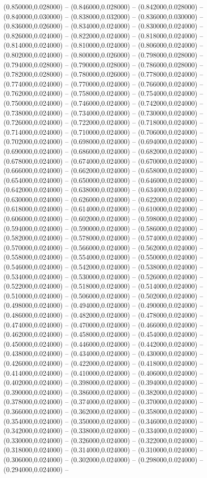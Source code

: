 (0.850000,0.028000) -- (0.846000,0.028000) -- (0.842000,0.028000) -- (0.840000,0.030000) -- (0.838000,0.032000) -- (0.836000,0.030000) -- (0.836000,0.026000) -- (0.834000,0.024000) -- (0.830000,0.024000) -- (0.826000,0.024000) -- (0.822000,0.024000) -- (0.818000,0.024000) -- (0.814000,0.024000) -- (0.810000,0.024000) -- (0.806000,0.024000) -- (0.802000,0.024000) -- (0.800000,0.026000) -- (0.798000,0.028000) -- (0.794000,0.028000) -- (0.790000,0.028000) -- (0.786000,0.028000) -- (0.782000,0.028000) -- (0.780000,0.026000) -- (0.778000,0.024000) -- (0.774000,0.024000) -- (0.770000,0.024000) -- (0.766000,0.024000) -- (0.762000,0.024000) -- (0.758000,0.024000) -- (0.754000,0.024000) -- (0.750000,0.024000) -- (0.746000,0.024000) -- (0.742000,0.024000) -- (0.738000,0.024000) -- (0.734000,0.024000) -- (0.730000,0.024000) -- (0.726000,0.024000) -- (0.722000,0.024000) -- (0.718000,0.024000) -- (0.714000,0.024000) -- (0.710000,0.024000) -- (0.706000,0.024000) -- (0.702000,0.024000) -- (0.698000,0.024000) -- (0.694000,0.024000) -- (0.690000,0.024000) -- (0.686000,0.024000) -- (0.682000,0.024000) -- (0.678000,0.024000) -- (0.674000,0.024000) -- (0.670000,0.024000) -- (0.666000,0.024000) -- (0.662000,0.024000) -- (0.658000,0.024000) -- (0.654000,0.024000) -- (0.650000,0.024000) -- (0.646000,0.024000) -- (0.642000,0.024000) -- (0.638000,0.024000) -- (0.634000,0.024000) -- (0.630000,0.024000) -- (0.626000,0.024000) -- (0.622000,0.024000) -- (0.618000,0.024000) -- (0.614000,0.024000) -- (0.610000,0.024000) -- (0.606000,0.024000) -- (0.602000,0.024000) -- (0.598000,0.024000) -- (0.594000,0.024000) -- (0.590000,0.024000) -- (0.586000,0.024000) -- (0.582000,0.024000) -- (0.578000,0.024000) -- (0.574000,0.024000) -- (0.570000,0.024000) -- (0.566000,0.024000) -- (0.562000,0.024000) -- (0.558000,0.024000) -- (0.554000,0.024000) -- (0.550000,0.024000) -- (0.546000,0.024000) -- (0.542000,0.024000) -- (0.538000,0.024000) -- (0.534000,0.024000) -- (0.530000,0.024000) -- (0.526000,0.024000) -- (0.522000,0.024000) -- (0.518000,0.024000) -- (0.514000,0.024000) -- (0.510000,0.024000) -- (0.506000,0.024000) -- (0.502000,0.024000) -- (0.498000,0.024000) -- (0.494000,0.024000) -- (0.490000,0.024000) -- (0.486000,0.024000) -- (0.482000,0.024000) -- (0.478000,0.024000) -- (0.474000,0.024000) -- (0.470000,0.024000) -- (0.466000,0.024000) -- (0.462000,0.024000) -- (0.458000,0.024000) -- (0.454000,0.024000) -- (0.450000,0.024000) -- (0.446000,0.024000) -- (0.442000,0.024000) -- (0.438000,0.024000) -- (0.434000,0.024000) -- (0.430000,0.024000) -- (0.426000,0.024000) -- (0.422000,0.024000) -- (0.418000,0.024000) -- (0.414000,0.024000) -- (0.410000,0.024000) -- (0.406000,0.024000) -- (0.402000,0.024000) -- (0.398000,0.024000) -- (0.394000,0.024000) -- (0.390000,0.024000) -- (0.386000,0.024000) -- (0.382000,0.024000) -- (0.378000,0.024000) -- (0.374000,0.024000) -- (0.370000,0.024000) -- (0.366000,0.024000) -- (0.362000,0.024000) -- (0.358000,0.024000) -- (0.354000,0.024000) -- (0.350000,0.024000) -- (0.346000,0.024000) -- (0.342000,0.024000) -- (0.338000,0.024000) -- (0.334000,0.024000) -- (0.330000,0.024000) -- (0.326000,0.024000) -- (0.322000,0.024000) -- (0.318000,0.024000) -- (0.314000,0.024000) -- (0.310000,0.024000) -- (0.306000,0.024000) -- (0.302000,0.024000) -- (0.298000,0.024000) -- (0.294000,0.024000) -- 